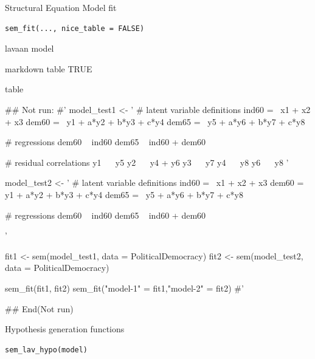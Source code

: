 \documentclass[a4paper]{book}
\begin{document}
%
\begin{Description}
Structural Equation Model fit
\end{Description}
%
\begin{Usage}
\begin{verbatim}
sem_fit(..., nice_table = FALSE)
\end{verbatim}
\end{Usage}
%
\begin{Arguments}
\begin{ldescription}
\item[\code{...}] lavaan model

\item[\code{nice\_table}] markdown table TRUE
\end{ldescription}
\end{Arguments}
%
\begin{Value}
table
\end{Value}
%
\begin{Examples}
\begin{ExampleCode}
\#\# Not run: 
#'
model_test1 <- '
  # latent variable definitions
     ind60 =~ x1 + x2 + x3
     dem60 =~ y1 + a*y2 + b*y3 + c*y4
     dem65 =~ y5 + a*y6 + b*y7 + c*y8

  # regressions
    dem60 ~ ind60
    dem65 ~ ind60 + dem60

  # residual correlations
    y1 ~~ y5
    y2 ~~ y4 + y6
    y3 ~~ y7
    y4 ~~ y8
    y6 ~~ y8
'

model_test2 <- '
  # latent variable definitions
     ind60 =~ x1 + x2 + x3
     dem60 =~ y1 + a*y2 + b*y3 + c*y4
     dem65 =~ y5 + a*y6 + b*y7 + c*y8

  # regressions
    dem60 ~ ind60
    dem65 ~ ind60 + dem60

'

fit1 <- sem(model_test1, data = PoliticalDemocracy)
fit2 <- sem(model_test2, data = PoliticalDemocracy)

sem_fit(fit1, fit2)
sem_fit("model-1" = fit1,"model-2" = fit2)
#'

## End(Not run)
\end{ExampleCode}
\end{Examples}
%
\begin{Description}
Hypothesis generation functions
\end{Description}
%
\begin{Usage}
\begin{verbatim}
sem_lav_hypo(model)
\end{verbatim}
\end{Usage}
\end{document}
